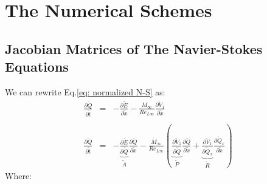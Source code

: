 \documentclass[11pt, a4paper]{article}
\newcommand{\parder}[2]{\frac{\partial {#1}}{\partial {#2}}}
\begin{document}
\section{The Numerical Schemes}
\subsection{Jacobian Matrices of The Navier-Stokes Equations}
We can rewrite Eq.\ref{eq: normalized N-S} as:
\begin{equation}
    \begin{array}{lcl}
        \displaystyle\parder{\tilde{Q}}{\tilde{t}} & = & \displaystyle-\parder{\tilde{E}}{\tilde{x}}-\frac{M_\infty}{Re_{L\infty}}\parder{\tilde{V}_1}{\tilde{x}} \\\\
        \displaystyle\parder{\tilde{Q}}{\tilde{t}} & = & \displaystyle-\underbrace{\parder{\tilde{E}}{\tilde{Q}}}_{\tilde{A}}\parder{\tilde{Q}}{\tilde{x}}-\frac{M_\infty}{Re_{L\infty}}\left(\underbrace{\parder{\tilde{V}_1}{\tilde{Q}}}_{\tilde{P}}\parder{\tilde{Q}}{\tilde{x}}+\underbrace{\parder{\tilde{V}_1}{\tilde{Q}_x}}_{\tilde{R}}\parder{\tilde{Q}_x}{\tilde{x}}\right)
    \end{array}
    \label{eq: chain rule}
\end{equation}
Where:
\end{document}
